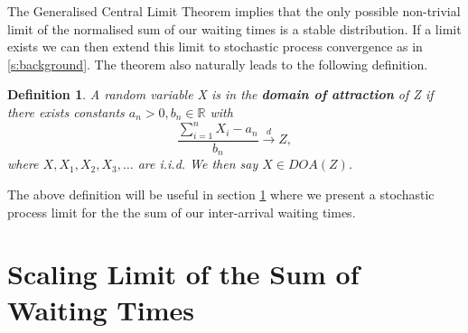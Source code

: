 \documentclass[honours,12pt]{unswthesis}
\newcommand{\R}{\mathbb{R}}
\newcommand{\1}{\mathbf 1}
\newtheorem{definition}[equation]{Definition}
\numberwithin{equation}{section}
\theoremstyle{definition}
\theoremstyle{remark}
\begin{document}
\noindent The Generalised Central Limit Theorem implies that the only possible non-trivial limit of the normalised sum of our waiting times is a stable distribution. If a limit exists we can then extend this limit to stochastic process convergence as in \ref{s:background}. The theorem also naturally leads to the following definition.\\

\begin{definition}\cite{Nolan2015}\label{def:DOA}
	A random variable X is in the \textbf{domain of attraction} of Z if there exists constants $a_n>0,b_n\in\R$ with
	\[
		\frac{\sum^n_{i=1}X_i-a_n}{b_n} \overset{d}{\longrightarrow}Z,
	\]
	where $X, X_1, X_2, X_3, \ldots$ are i.i.d. We then say $X\in DOA(Z)$.\\
\end{definition}

\noindent The above definition will be useful in section \ref{s:waitingTimes} where we present a stochastic process limit for the the sum of our inter-arrival waiting times.\\

\section{Scaling Limit of the Sum of Waiting Times}\label{s:waitingTimes}
\end{document}

